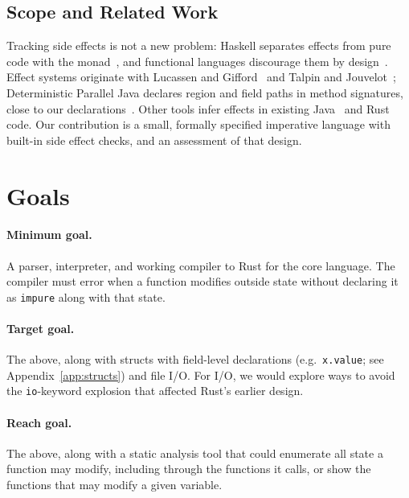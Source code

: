 \documentclass[12pt, letterpaper]{article}
\begin{document}
\subsection{Scope and Related Work}
Tracking side effects is not a new problem: Haskell separates effects from pure code with the monad~\cite{peyton_jones_imperative_1993}, and functional languages discourage them by design~\cite{hughes_why_1989}.
Effect systems originate with Lucassen and Gifford~\cite{lucassen_polymorphic_1988} and Talpin and Jouvelot~\cite{talpin_type_1994}; Deterministic Parallel Java declares region and field paths in method signatures, close to our declarations~\cite{bocchino_type_2009}.
Other tools infer effects in existing Java~\cite{cousot_purity_2005} and Rust~\cite{zoghbi_auditing_2026} code.
Our contribution is a small, formally specified imperative language with built-in side effect checks, and an assessment of that design.

\section{Goals}

\paragraph{Minimum goal.}

A parser, interpreter, and working compiler to Rust for the core language.
The compiler must error when a function modifies outside state without declaring it as \texttt{impure} along with that state.

\paragraph{Target goal.}

The above, along with structs with field-level declarations (e.g.\ \texttt{x.value}; see Appendix~\ref{app:structs}) and file I/O.
For I/O, we would explore ways to avoid the \texttt{io}-keyword explosion that affected Rust's earlier design.

\paragraph{Reach goal.}

The above, along with a static analysis tool that could enumerate all state a function may modify, including through the functions it calls, or show the functions that may modify a given variable.
\end{document}
